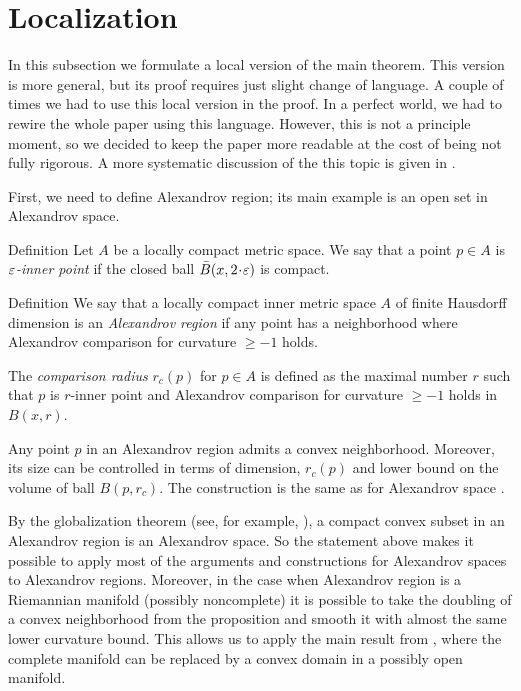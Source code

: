 \section{Localization}\label{sec:local}

In this subsection we formulate a local version of the main theorem.
This version is more general, but its proof requires just slight change of language.
A couple of times we had to use this local version in the proof.
In a perfect world, we had to rewire the whole paper using this language.
However, this is not a principle moment,
so we decided to keep the paper more readable at the cost of being not fully rigorous.
A more systematic discussion of the this topic is given in \cite{LNep}.

First, we need to define Alexandrov region;
its main example is an open set in Alexandrov space.

\begin{thm}{Definition}
Let $A$ be a locally compact metric space. 
We say that a point  $p\in A$
is  \emph{ $\varepsilon$-inner point} if
the closed ball $\bar B(x,2\cdot\eps)$ is compact.
\end{thm}

\begin{thm}{Definition}
We say that a locally compact inner metric space $A$ of finite Hausdorff dimension
is an \emph{Alexandrov region} if
any point has a neighborhood where Alexandrov
comparison for curvature $\ge -1$ holds.

The \emph{comparison radius} $r_c(p)$ for $p\in A$ is defined as 
the maximal number $r$ such that
$p$ is $r$-inner point and Alexandrov
comparison for curvature $\ge -1$ holds in
$B(x,r)$.
\end{thm}

Any point $p$ in an Alexandrov region admits a convex neighborhood.
Moreover, its size can be controlled in terms of dimension, $r_c(p)$ and lower bound on the volume of ball $B(p,r_c)$.
The construction is the same as for Alexandrov space \cite[4.3]{perelman-petrunin}.

By the globalization theorem (see, for example, \cite{AKP}), a compact convex subset in an Alexandrov region is an Alexandrov space.
So the statement above makes it possible to apply most of the arguments and constructions for Alexandrov spaces to Alexandrov regions. 
Moreover, in the case when Alexandrov region is a Riemannian manifold (possibly noncomplete) it is possible to take the doubling of a convex neighborhood from the proposition
and smooth it with almost the same lower curvature bound.
This allows us to apply the main result from \cite{petrunin-SC}, where the complete manifold can be replaced by a convex domain in a possibly open manifold. 

